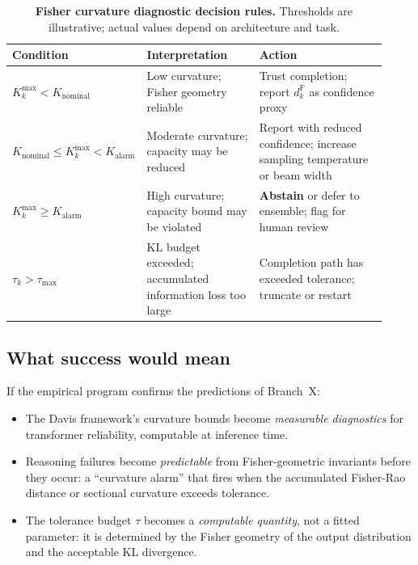 \documentclass[11pt]{article}
\theoremstyle{remark}
\begin{document}
\begin{table}[htbp]
\centering
\caption{\textbf{Fisher curvature diagnostic decision rules.}  Thresholds are
illustrative; actual values depend on architecture and task.}
\label{tab:fisher-diagnostic-rules}
\begin{tabularx}{\linewidth}{@{}p{0.28\linewidth}p{0.30\linewidth}p{0.34\linewidth}@{}}
\toprule
\textbf{Condition} & \textbf{Interpretation} & \textbf{Action} \\
\midrule
$K_k^{\max} < K_{\mathrm{nominal}}$ &
Low curvature; Fisher geometry reliable &
Trust completion; report $d^{\mathrm{F}}_k$ as confidence proxy \\
\addlinespace[2pt]
$K_{\mathrm{nominal}} \le K_k^{\max} < K_{\mathrm{alarm}}$ &
Moderate curvature; capacity may be reduced &
Report with reduced confidence; increase
sampling temperature or beam width \\
\addlinespace[2pt]
$K_k^{\max} \ge K_{\mathrm{alarm}}$ &
High curvature; capacity bound may be violated &
\textbf{Abstain} or defer to ensemble; flag for human review \\
\addlinespace[2pt]
$\tau_k > \tau_{\mathrm{max}}$ &
KL budget exceeded; accumulated information loss too large &
Completion path has exceeded tolerance; truncate or restart \\
\bottomrule
\end{tabularx}
\end{table}

\subsection{What success would mean}

If the empirical program confirms the predictions of Branch~X:
\begin{itemize}
  \item The Davis framework's curvature bounds become \emph{measurable
  diagnostics} for transformer reliability, computable at inference time.
  \item Reasoning failures become \emph{predictable} from Fisher-geometric
  invariants before they occur: a ``curvature alarm'' that fires when the
  accumulated Fisher-Rao distance or sectional curvature exceeds
  tolerance.
  \item The tolerance budget $\tau$ becomes a \emph{computable quantity},
  not a fitted parameter: it is determined by the Fisher geometry of the
  output distribution and the acceptable KL divergence.
\end{itemize}
\end{document}
